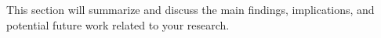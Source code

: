 \documentclass[
thesis.tex
]{subfiles}
\begin{document}
	\newpage
	
	This section will summarize and discuss the main findings, implications, and potential future work related to your research.	
\end{document}
